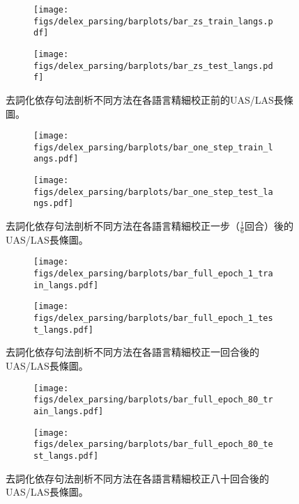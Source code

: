 \begin{figure}[htbp]
    \centering
    \begin{subfigure}[t]{0.8\textwidth}
        \centering
        \texttt{[image: figs/delex\_parsing/barplots/bar\_zs\_train\_langs.pdf]}
    \end{subfigure}
    \vspace{-12pt}
    \begin{subfigure}[t]{0.8\textwidth}
        \centering
        \texttt{[image: figs/delex\_parsing/barplots/bar\_zs\_test\_langs.pdf]}
    \end{subfigure}
    \caption{去詞化依存句法剖析不同方法在各語言精細校正前的UAS/LAS長條圖。}
    \label{fig:bar_zs}
\end{figure}
\begin{figure}[htbp]
    \centering
    \begin{subfigure}[t]{0.8\textwidth}
        \centering
        \texttt{[image: figs/delex\_parsing/barplots/bar\_one\_step\_train\_langs.pdf]}
    \end{subfigure}
    \vspace{-12pt}
    \begin{subfigure}[t]{0.8\textwidth}
        \centering
        \texttt{[image: figs/delex\_parsing/barplots/bar\_one\_step\_test\_langs.pdf]}
    \end{subfigure}
    \caption{去詞化依存句法剖析不同方法在各語言精細校正一步（$\frac{1}{6}$回合）後的UAS/LAS長條圖。}
    \label{fig:bar_one_step}
\end{figure}
\begin{figure}[htbp]
    \centering
    \begin{subfigure}[t]{0.8\textwidth}
        \centering
        \texttt{[image: figs/delex\_parsing/barplots/bar\_full\_epoch\_1\_train\_langs.pdf]}
    \end{subfigure}
    \vspace{-12pt}
    \begin{subfigure}[t]{0.8\textwidth}
        \centering
        \texttt{[image: figs/delex\_parsing/barplots/bar\_full\_epoch\_1\_test\_langs.pdf]}
    \end{subfigure}
    \caption{去詞化依存句法剖析不同方法在各語言精細校正一回合後的UAS/LAS長條圖。}
    \label{fig:bar_full_epoch_1}
\end{figure}
\begin{figure}[htbp]
    \centering
    \begin{subfigure}[t]{0.8\textwidth}
        \centering
        \texttt{[image: figs/delex\_parsing/barplots/bar\_full\_epoch\_80\_train\_langs.pdf]}
    \end{subfigure}
    \vspace{-12pt}
    \begin{subfigure}[t]{0.8\textwidth}
        \centering
        \texttt{[image: figs/delex\_parsing/barplots/bar\_full\_epoch\_80\_test\_langs.pdf]}
    \end{subfigure}
    \caption{去詞化依存句法剖析不同方法在各語言精細校正八十回合後的UAS/LAS長條圖。}
    \label{fig:bar_full_epoch_80}
\end{figure}